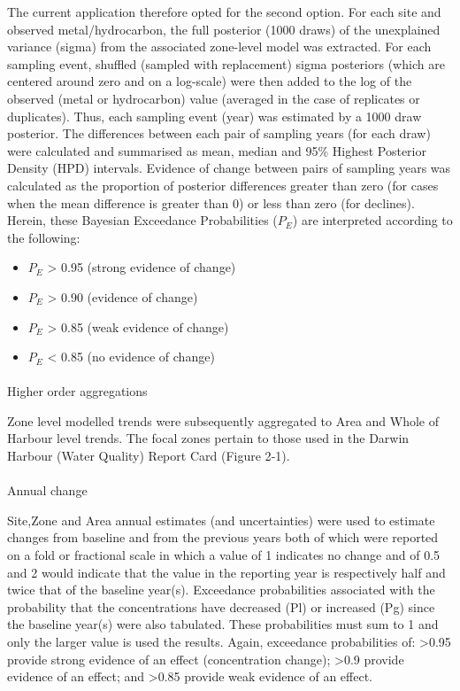 \documentclass[
  8pt,
  a4paper]{article}
\makeatletter
\let\oldparagraph\paragraph
\renewcommand{\paragraph}{
    \@ifstar
      \xxxParagraphStar
      \xxxParagraphNoStar
  }
\newcommand{\xxxParagraphStar}[1]{\oldparagraph*{#1}\mbox{}}
\newcommand{\xxxParagraphNoStar}[1]{\oldparagraph{#1}\mbox{}}
\providecommand{\tightlist}{%
  \setlength{\itemsep}{0pt}\setlength{\parskip}{0pt}}
\makeatother
\begin{document}
The current application therefore opted for the second option. For each
site and observed metal/hydrocarbon, the full posterior (1000 draws) of
the unexplained variance (sigma) from the associated zone-level model
was extracted. For each sampling event, shuffled (sampled with
replacement) sigma posteriors (which are centered around zero and on a
log-scale) were then added to the log of the observed (metal or
hydrocarbon) value (averaged in the case of replicates or duplicates).
Thus, each sampling event (year) was estimated by a 1000 draw posterior.
The differences between each pair of sampling years (for each draw) were
calculated and summarised as mean, median and 95\% Highest Posterior
Density (HPD) intervals. Evidence of change between pairs of sampling
years was calculated as the proportion of posterior differences greater
than zero (for cases when the mean difference is greater than 0) or less
than zero (for declines). Herein, these Bayesian Exceedance
Probabilities (\(P_E\)) are interpreted according to the following:

\begin{itemize}
\tightlist
\item
  \(P_E\) \textgreater{} 0.95 (strong evidence of change)
\item
  \(P_E\) \textgreater{} 0.90 (evidence of change)
\item
  \(P_E\) \textgreater{} 0.85 (weak evidence of change)
\item
  \(P_E\) \textless{} 0.85 (no evidence of change)
\end{itemize}

\paragraph{Higher order aggregations}\label{higher-order-aggregations}

Zone level modelled trends were subsequently aggregated to Area and
Whole of Harbour level trends. The focal zones pertain to those used in
the Darwin Harbour (Water Quality) Report Card (Figure 2‑1).

\paragraph{Annual change}\label{annual-change}

Site,Zone and Area annual estimates (and uncertainties) were used to
estimate changes from baseline and from the previous years both of which
were reported on a fold or fractional scale in which a value of 1
indicates no change and of 0.5 and 2 would indicate that the value in
the reporting year is respectively half and twice that of the baseline
year(s). Exceedance probabilities associated with the probability that
the concentrations have decreased (Pl) or increased (Pg) since the
baseline year(s) were also tabulated. These probabilities must sum to 1
and only the larger value is used the results. Again, exceedance
probabilities of: \textgreater0.95 provide strong evidence of an effect
(concentration change); \textgreater0.9 provide evidence of an effect;
and \textgreater0.85 provide weak evidence of an effect.
\end{document}
